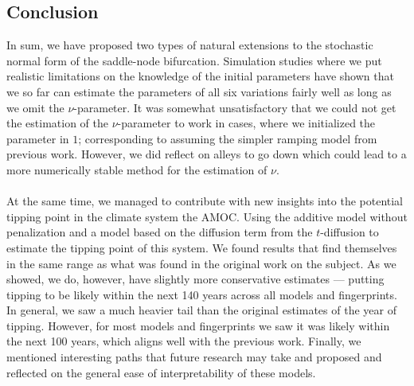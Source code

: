 \subsection{Conclusion}
In sum, we have proposed two types of natural extensions to the stochastic normal form of the saddle-node bifurcation. Simulation studies where we put realistic limitations on the knowledge of the initial parameters have shown that we so far can estimate the parameters of all six variations fairly well as long as we omit the $\nu$-parameter. It was somewhat unsatisfactory that we could not get the estimation of the $\nu$-parameter to work in cases, where we initialized the parameter in $1$; corresponding to assuming the simpler ramping model from previous work. However, we did reflect on alleys to go down which could lead to a more numerically stable method for the estimation of $\nu$.\\\\
At the same time, we managed to contribute with new insights into the potential tipping point in the climate system the AMOC. Using the additive model without penalization and a model based on the diffusion term from the $t$-diffusion to estimate the tipping point of this system. We found results that find themselves in the same range as what was found in the original work on the subject. As we showed, we do, however, have slightly more conservative estimates — putting tipping to be likely within the next 140 years across all models and fingerprints. In general, we saw a much heavier tail than the original estimates of the year of tipping. However, for most models and fingerprints we saw it was likely within the next 100 years, which aligns well with the previous work. Finally, we mentioned interesting paths that future research may take and proposed and reflected on the general ease of interpretability of these models. 